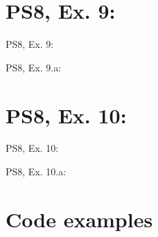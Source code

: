 \section{PS8, Ex. 9: }

\begin{frame}{PS8, Ex. 9: }
  \begin{multicols}{2}
    \vfill\null\columnbreak
    \vfill
  \end{multicols}
\end{frame}

\begin{frame}{PS8, Ex. 9.a: }
  \begin{multicols}{2}
    \vfill\null\columnbreak
    \vfill
  \end{multicols}
\end{frame}



\section{PS8, Ex. 10: }

\begin{frame}{PS8, Ex. 10: }
  \begin{multicols}{2}
    \vfill\null\columnbreak
    \vfill
  \end{multicols}
\end{frame}

\begin{frame}{PS8, Ex. 10.a: }
  \begin{multicols}{2}
    \vfill\null\columnbreak
    \vfill
  \end{multicols}
\end{frame}



\section{Code examples} %

